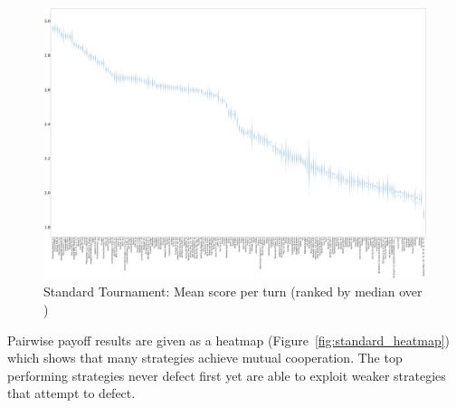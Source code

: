 \documentclass{article}
\begin{document}
\begin{landscape}
    \begin{figure}[!hbtp]
        \centering
        \includegraphics[width=\paperwidth]{./assets/standard_scores_boxplots.pdf}
        \caption{Standard Tournament: Mean score per turn (ranked by median
        over
        \protecttournaments)}
        \label{fig:standard_boxplot}
    \end{figure}
\end{landscape}

Pairwise payoff results are given as a heatmap (Figure~\ref{fig:standard_heatmap})
which shows that many strategies achieve mutual cooperation. The top performing
strategies never defect first yet are able to exploit weaker strategies that
attempt to defect.
\end{document}
